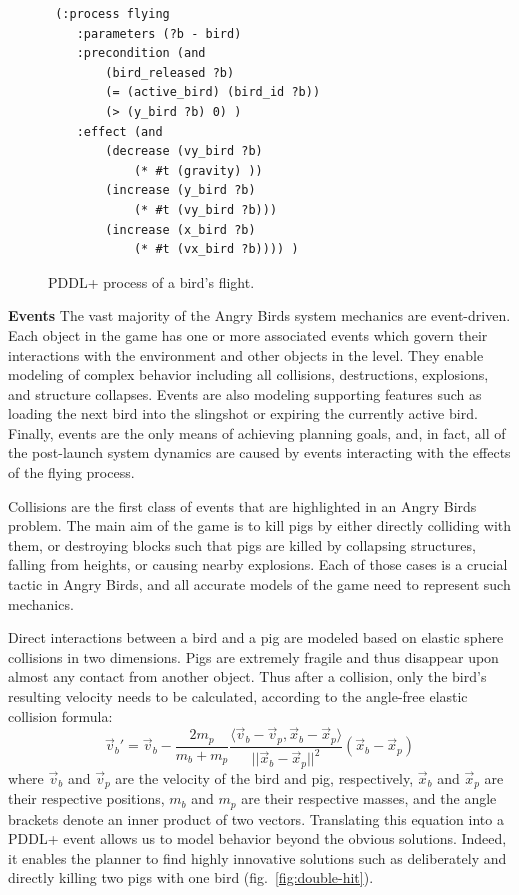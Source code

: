 \begin{figure}
\begin{center}
    \fontsize{8pt}{10pt}\selectfont
\begin{verbatim}
 (:process flying
    :parameters (?b - bird)
    :precondition (and
        (bird_released ?b)
        (= (active_bird) (bird_id ?b))
        (> (y_bird ?b) 0) )
    :effect (and
        (decrease (vy_bird ?b) 
            (* #t (gravity) ))
        (increase (y_bird ?b) 
            (* #t (vy_bird ?b)))
        (increase (x_bird ?b) 
            (* #t (vx_bird ?b)))) )
\end{verbatim}
\caption{PDDL+ process of a bird's flight.}
\label{fig:process-flying}
\end{center}
\end{figure}
\noindent\textbf{Events} 
The vast majority of the Angry Birds system mechanics are event-driven. Each object in the game has one or more associated events which govern their interactions with the environment and other objects in the level. They enable modeling of complex behavior including all collisions, destructions, explosions, and structure collapses. Events are also modeling supporting features such as loading the next bird into the slingshot or expiring the currently active bird. Finally, events are the only means of achieving planning goals, and, in fact, all of the post-launch system dynamics are caused by events interacting with the effects of the flying process. 

Collisions are the first class of events that are highlighted in an Angry Birds problem. The main aim of the game is to kill pigs by either directly colliding with them, or destroying blocks such that pigs are killed by collapsing structures, falling from heights, or causing nearby explosions. Each of those cases is a crucial tactic in Angry Birds, and all accurate models of the game need to represent such mechanics. 

Direct interactions between a bird and a pig are modeled based on elastic sphere collisions in two dimensions. Pigs are extremely fragile and thus disappear upon almost any contact from another object. Thus after a collision, only the bird's resulting velocity needs to be calculated, according to the angle-free elastic collision formula:
\begin{equation} \label{eq:collision}
\vec{v}_{b}' = \vec{v}_{b} - \frac{2m_{p}}{m_{b}+m_{p}} \frac{\langle \vec{v}_{b} - \vec{v}_{p},\vec{x}_{b} - \vec{x}_{p}\rangle}{||\vec{x}_{b} - \vec{x}_{p}||^2}(\vec{x}_{b} - \vec{x}_{p})
\end{equation}
where $\vec{v}_b$ and $\vec{v}_p$ are the velocity of the bird and pig, respectively, $\vec{x}_b$ and $\vec{x}_p$ are their respective positions, $m_b$ and $m_p$ are their respective masses, and the angle brackets denote an inner product of two vectors. 
Translating this equation into a PDDL+ event allows us to model behavior beyond the obvious solutions. Indeed, it enables the planner to find highly innovative solutions such as deliberately and directly killing two pigs with one bird (fig.~\ref{fig:double-hit}).

